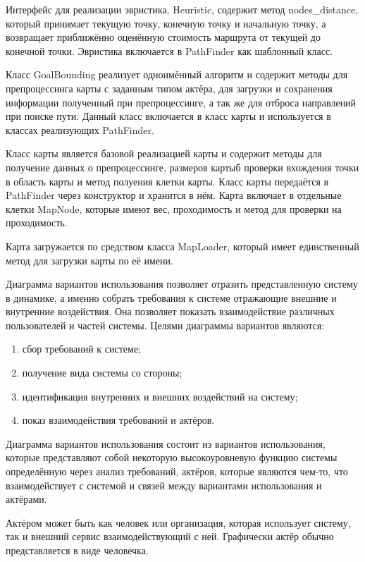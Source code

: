 Интерфейс для реализации эвристика, Heuristic, содержит метод nodes\_distance, который принимает текущую точку, конечную точку и начальную точку, а возвращает приближённо оценённую стоимость маршрута от текущей до конечной точки. Эвристика включается в PathFinder как шаблонный класс.

Класс GoalBounding реализует одноимённый алгоритм и содержит методы для препроцессинга карты с заданным типом актёра, для загрузки и сохранения информации полученный при препроцессинге, а так же для отброса направлений при поиске пути. Данный класс включается в класс карты и используется в классах реализующих PathFinder.

Класс карты является базовой реализацией карты и содержит методы для получение данных о препроцессинге, размеров картыб проверки вхождения точки в область карты и метод полуения клетки карты. Класс карты передаётся в PathFinder через конструктор и хранится в нём. Карта включает в отдельные клетки MapNode, которые имеют вес, проходимость и метод для проверки на проходимость.

Карта загружается по средством класса MapLoader, который имеет единственный метод для загрузки карты по её имени.

Диаграмма вариантов использования позволяет отразить представленную систему в динамике, а именно собрать требования к системе отражающие внешние и внутренние воздействия. Она позволяет показать взаимодействие различных пользователей и частей системы. Целями диаграммы вариантов являются:

\begin{enumerate}
	\item сбор требований к системе;
	\item получение вида системы со стороны;
	\item идентификация внутренних и внешних воздействий на систему;
	\item показ взаимодействия требований и актёров.
\end{enumerate}

Диаграмма вариантов использования состоит из вариантов использования, которые представляют собой некоторую высокоуровневую функцию системы определённую через анализ требований, актёров, которые являются чем-то, что взаимодействует с системой и связей между вариантами использования и актёрами.

Актёром может быть как человек или организация, которая использует систему, так и внешний сервис взаимодействующий с ней. Графически актёр обычно представляется в виде человечка.

